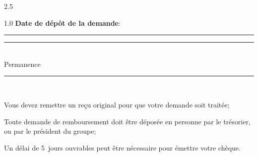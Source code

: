 \documentclass[10pt, A4]{letter}
\begin{document}
\begin{flushleft}
\begin{spacing}{2.5}
	\end{spacing}
        \begin{spacing}{1.0}
	\textbf{Date de dépôt de la demande}: \rule{12em}{0.8pt}\hfill\rule{12em}{0.8pt}\hfill\\
	{\footnotesize\hspace{39.25em}Permanence\hfill\\}
	\rule{\textwidth}{1pt}\\\vspace{1em}
	\end{spacing}

        {\singlespacing\footnotesize\item[*] Vous devez remettre un reçu original pour que votre demande soit traitée;\\
        \item[*] Toute demande de remboursement doit être déposée en personne par le trésorier, ou par le président du groupe;\\
        \item[*] Un délai de 5 jours ouvrables peut être nécessaire pour émettre votre chèque.\\}
	\vfill
    \end{flushleft}
\end{document}
